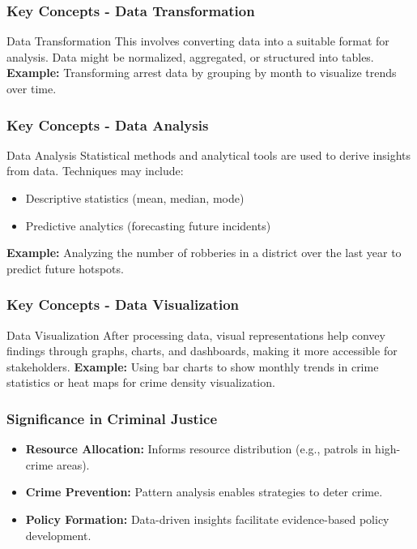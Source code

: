 \documentclass[aspectratio=169]{beamer}
\begin{document}
\begin{frame}[fragile]
    \frametitle{Key Concepts - Data Transformation}
    \begin{block}{Data Transformation}
        This involves converting data into a suitable format for analysis. Data might be normalized, aggregated, or structured into tables.
        \textbf{Example:} Transforming arrest data by grouping by month to visualize trends over time.
    \end{block}
\end{frame}

\begin{frame}[fragile]
    \frametitle{Key Concepts - Data Analysis}
    \begin{block}{Data Analysis}
        Statistical methods and analytical tools are used to derive insights from data. Techniques may include:
        \begin{itemize}
            \item Descriptive statistics (mean, median, mode)
            \item Predictive analytics (forecasting future incidents)
        \end{itemize}
        \textbf{Example:} Analyzing the number of robberies in a district over the last year to predict future hotspots.
    \end{block}
\end{frame}

\begin{frame}[fragile]
    \frametitle{Key Concepts - Data Visualization}
    \begin{block}{Data Visualization}
        After processing data, visual representations help convey findings through graphs, charts, and dashboards, making it more accessible for stakeholders.
        \textbf{Example:} Using bar charts to show monthly trends in crime statistics or heat maps for crime density visualization.
    \end{block}
\end{frame}

\begin{frame}[fragile]
    \frametitle{Significance in Criminal Justice}
    \begin{itemize}
        \item \textbf{Resource Allocation:} Informs resource distribution (e.g., patrols in high-crime areas).
        \item \textbf{Crime Prevention:} Pattern analysis enables strategies to deter crime.
        \item \textbf{Policy Formation:} Data-driven insights facilitate evidence-based policy development.
    \end{itemize}
\end{frame}
\end{document}
